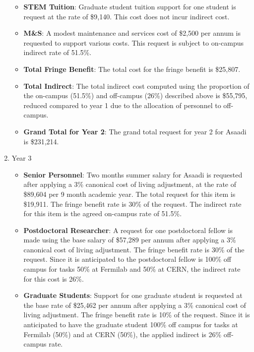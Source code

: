 \begin{enumerate}
\begin{itemize}[noitemsep,nolistsep]
\item {{\bf STEM Tuition}: Graduate student tuition support for one student is request at the rate of \$9,140.  This cost does not incur indirect cost.}

\item {{\bf M\&S}: A modest maintenance and services cost of \$2,500 per annum is requested to support various costs.   This request is subject to on-campus indirect rate of 51.5\%.}

\item {{\bf Total Fringe Benefit}: The total cost for the fringe benefit is \$25,807.}

\item {{\bf Total Indirect}: The total indirect cost computed using the proportion of the on-campus (51.5\%) and off-campus (26\%) described above is \$55,795, reduced compared to year 1 due to the allocation of personnel to off-campus.}

\item {{\bf Grand Total for Year 2}: The grand total request for year 2 for Asaadi is \$231,214.}

\end{itemize}

\item{Year 3}
\begin{itemize}[noitemsep,nolistsep]
\item{{\bf Senior Personnel}: Two months summer salary for Asaadi is requested after applying a 3\% canonical cost of living adjustment, at the rate of \$89,604 per 9 month academic year.  The total request for this item is \$19,911.   The fringe benefit rate is 30\% of the request.  The indirect rate for this item is the agreed on-campus rate of 51.5\%.}

\item {{\bf Postdoctoral Researcher}: A request for one postdoctoral fellow is made using the base salary of \$57,289 per annum after applying a 3\% canonical cost of living adjustment.  The fringe benefit rate is 30\% of the request.  Since it is anticipated to the postdoctoral fellow is 100\% off campus for tasks 50\% at Fermilab and 50\% at CERN, the indirect rate for this cost is 26\%.} 

\item{{\bf Graduate Students}: Support for one graduate student is requested at the base rate of \$25,462 per annum after applying a 3\% canonical cost of living adjustment.   The fringe benefit rate is 10\% of the request.  Since it is anticipated to have the graduate student 100\% off campus for tasks at Fermilab (50\%) and at CERN (50\%), the applied indirect is 26\% off-campus rate.}


\end{itemize}
\end{enumerate}
